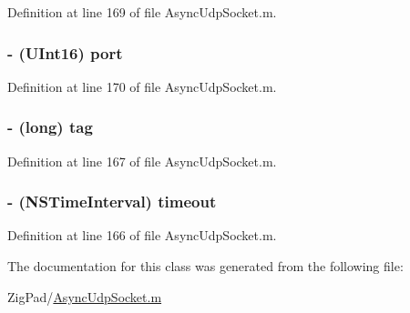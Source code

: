 Definition at line 169 of file AsyncUdpSocket.m.

\hypertarget{interface_async_receive_packet_a96ebf7a8d647c5659f83c9f949dfea88}{
\subsubsection[{port}]{\setlength{\rightskip}{0pt plus 5cm}-\/ (UInt16) {\bf port}}}
\label{interface_async_receive_packet_a96ebf7a8d647c5659f83c9f949dfea88}


Definition at line 170 of file AsyncUdpSocket.m.

\hypertarget{interface_async_receive_packet_ae10c29173f0af40507d7e787905c7130}{
\subsubsection[{tag}]{\setlength{\rightskip}{0pt plus 5cm}-\/ (long) {\bf tag}}}
\label{interface_async_receive_packet_ae10c29173f0af40507d7e787905c7130}


Definition at line 167 of file AsyncUdpSocket.m.

\hypertarget{interface_async_receive_packet_a39233eb85b4cbae04411577510e7c5e6}{
\subsubsection[{timeout}]{\setlength{\rightskip}{0pt plus 5cm}-\/ (NSTimeInterval) {\bf timeout}}}
\label{interface_async_receive_packet_a39233eb85b4cbae04411577510e7c5e6}


Definition at line 166 of file AsyncUdpSocket.m.



The documentation for this class was generated from the following file:\begin{DoxyCompactItemize}
\item 
ZigPad/\hyperlink{_async_udp_socket_8m}{AsyncUdpSocket.m}\end{DoxyCompactItemize}
